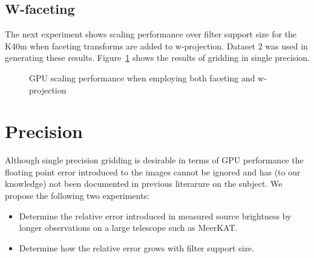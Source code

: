\subsection{W-faceting}
The next experiment shows scaling performance over filter support size for the K40m 
when faceting transforms are added to w-projection. Dataset 2 was used in generating
these results. Figure~\ref{FIG_WFACETING} shows the results of gridding in
single precision.
\begin{figure}[ht!]
 \begin{mdframed}
 \centering
  \caption{GPU scaling performance when employing both faceting and w-projection}
  \label{FIG_WFACETING}
  \end{mdframed}
\end{figure}
\section{Precision}
Although single precision gridding is desirable in terms of GPU performance the floating point error introduced to the images cannot be ignored and has (to our knowledge) not been documented
in previous literarure on the subject. We propose the following two experiments:
\begin{itemize}
 \item Determine the relative error introduced in measured source brightness by longer observations on a large telescope such as MeerKAT.
 \item Determine how the relative error grows with filter support size.
\end{itemize}

